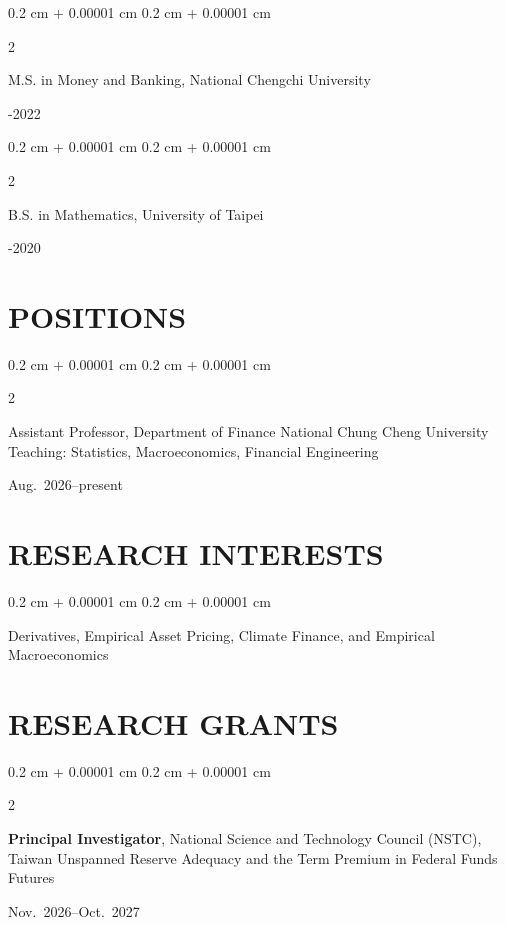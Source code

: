 \documentclass[12pt, letterpaper]{article}
\newenvironment{onecolentry}{
    \begin{adjustwidth}{
        0.2 cm + 0.00001 cm
    }{
        0.2 cm + 0.00001 cm
    }
}{
    \end{adjustwidth}
} %
\newenvironment{twocolentry}[2][]{
    \onecolentry
    \def\secondColumn{#2}
    \setcolumnwidth{\fill, 3.5 cm}
    \begin{paracol}{2}
}{
    \switchcolumn \raggedleft \secondColumn
    \end{paracol}
    \endonecolentry
} %
\begin{document}
    \begin{twocolentry}{2020-2022}
        M.S. in Money and Banking, National Chengchi University 
    \end{twocolentry}
    
    \vspace{0.2 cm}
    
    \begin{twocolentry}{2016-2020}
        B.S. in Mathematics, University of Taipei 
    \end{twocolentry}

    \section{POSITIONS}

    \begin{twocolentry}{\mbox{\small Aug. 2026--present}}
        Assistant Professor, Department of Finance
        \newline
        National Chung Cheng University
        \newline
        Teaching: Statistics, Macroeconomics, Financial Engineering
    \end{twocolentry}

    \section{RESEARCH INTERESTS}

    \begin{onecolentry}
        Derivatives, Empirical Asset Pricing, Climate Finance, and Empirical Macroeconomics
    \end{onecolentry}

    \section{RESEARCH GRANTS}

    \begin{twocolentry}{\mbox{\small Nov. 2026--Oct. 2027}}
        \textbf{Principal Investigator}, National Science and Technology Council (NSTC), Taiwan
        \newline
        Unspanned Reserve Adequacy and the Term Premium in Federal Funds Futures
    \end{twocolentry}

\end{document}
